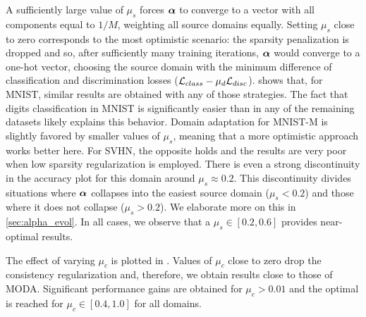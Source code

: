 A sufficiently large value of $\mu_s$ forces ${\bm{\alpha}}$ to converge to a vector with all components equal to $1/M$, weighting all source domains equally. Setting $\mu_s$ close to zero corresponds to the most optimistic scenario: the sparsity penalization is dropped and so, after sufficiently many training iterations, ${\bm{\alpha}}$ would converge to a one-hot vector, choosing the source domain with the minimum difference of classification and discrimination losses (${\mathcal{L}}_{class} - \mu_d{\mathcal{L}}_{disc}$).  shows that, for MNIST, similar results are obtained with any of those strategies. The fact that digits classification in MNIST is significantly easier than in any of the remaining datasets likely explains this behavior. Domain adaptation for MNIST-M is slightly favored by smaller values of $\mu_s$, meaning that a more optimistic approach works better here. For SVHN, the opposite holds and the results are very poor when low sparsity regularization is employed. There is even a strong discontinuity in the accuracy plot for this domain around $\mu_s \approx 0.2$. This discontinuity divides situations where ${\bm{\alpha}}$ collapses into the easiest source domain ($\mu_s < 0.2$) and those where it does not collapse ($\mu_s > 0.2$). We elaborate more on this in \ref{sec:alpha_evol}. In all cases, we observe that a $\mu_s \in [0.2, 0.6]$ provides near-optimal results.

The effect of varying $\mu_c$ is plotted in . Values of $\mu_c$ close to zero drop the consistency regularization and, therefore, we obtain results close to those of MODA. Significant performance gains are obtained for $\mu_c > 0.01$ and the optimal is reached for $\mu_c \in [0.4, 1.0]$ for all domains.

